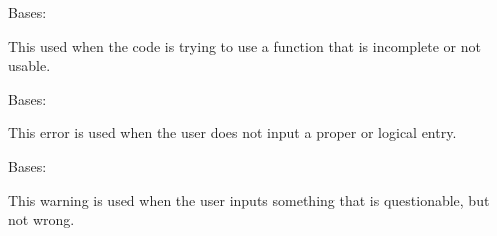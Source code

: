 \documentclass[letterpaper,10pt,english]{sphinxmanual}
\begin{document}

\begin{fulllineitems}
\label{\detokenize{python_docstrings/IfA_Smeargle.meta.errors:IfA_Smeargle.meta.errors.IncompleteError}}
Bases: {\hyperref[\detokenize{python_docstrings/IfA_Smeargle.meta.errors:IfA_Smeargle.meta.errors.Smeargle_BaseException}]{}}

This used when the code is trying to use a function that is incomplete or
not usable.

\end{fulllineitems}


\begin{fulllineitems}
\label{\detokenize{python_docstrings/IfA_Smeargle.meta.errors:IfA_Smeargle.meta.errors.InputError}}
Bases: {\hyperref[\detokenize{python_docstrings/IfA_Smeargle.meta.errors:IfA_Smeargle.meta.errors.Smeargle_Exception}]{}}

This error is used when the user does not input a proper or logical entry.

\end{fulllineitems}


\begin{fulllineitems}
\label{\detokenize{python_docstrings/IfA_Smeargle.meta.errors:IfA_Smeargle.meta.errors.InputWarning}}
Bases: {\hyperref[\detokenize{python_docstrings/IfA_Smeargle.meta.errors:IfA_Smeargle.meta.errors.Smeargle_Warning}]{}}

This warning is used when the user inputs something that is questionable,
but not wrong.

\end{fulllineitems}
\end{document}
